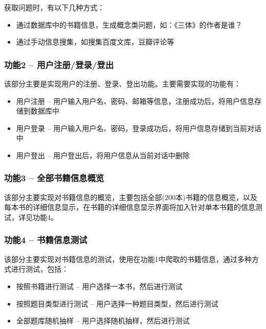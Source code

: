 \documentclass[twoside,11pt]{article}
\begin{document}
获取问题时，有以下几种方式：
\begin{itemize}
    \item 通过数据库中的书籍信息，生成概念类问题，如：《三体》的作者是谁？
    \item 通过手动信息搜集，如搜集百度文库，豆瓣评论等
\end{itemize}

\vspace{0.6cm}

\subsubsection{功能2 -- 用户注册/登录/登出}
该部分主要是实现用户的注册、登录、登出功能。主要需要实现的功能有：
\begin{itemize}
    \item 用户注册 -- 用户输入用户名、密码、邮箱等信息，注册成功后，将用户信息存储到数据库中
    \item 用户登录 -- 用户输入用户名、密码，登录成功后，将用户信息存储到当前对话中
    \item 用户登出 -- 用户登出后，将用户信息从当前对话中删除
\end{itemize}

\vspace{0.6cm}

\subsubsection{功能3 -- 全部书籍信息概览}
该部分主要实现对书籍信息的概览，主要包括全部(200本)书籍的信息概览，以及每本书的详细信息显示，在书籍的详细信息显示界面将加入针对单本书籍的信息测试，详见功能4。


\vspace{0.6cm}

\subsubsection{功能4 -- 书籍信息测试}
该部分主要实现对书籍信息的测试，使用在功能1中爬取的书籍信息，通过多种方式进行测试，包括：
\begin{itemize}
    \item 按照书籍进行测试 -- 用户选择一本书，然后进行测试
    \item 按照题目类型进行测试 -- 用户选择一种题目类型，然后进行测试
    \item 全部题库随机抽样 -- 用户选择随机抽样，然后进行测试
\end{itemize}
\end{document}
